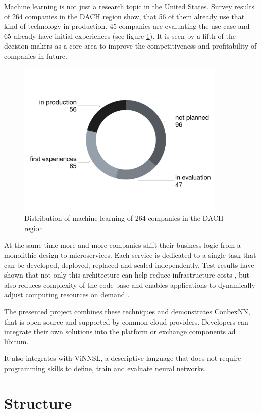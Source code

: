 Machine learning is not just a research topic in the United States.
Survey results of 264 companies in the DACH region show, that 56 of them
already use that kind of technology in production. 45 companies are
evaluating the use case and 65 already have initial experiences (see
figure \ref{img.crisp_ml_verbreitung}). It is seen by a fifth of the
decision-makers as a core area to improve the competitiveness and
profitability of companies in future. \cite{crisp}

\begin{figure}
\centering
\includegraphics[width=10.00000cm]{images/crisp_ml_verbreitung}
\caption{Distribution of machine learning of 264 companies in the DACH
region \cite{crisp}\label{img.crisp_ml_verbreitung}}
\end{figure}

At the same time more and more companies shift their business logic from
a monolithic design to microservices. Each service is dedicated to a
single task that can be developed, deployed, replaced and scaled
independently. Test results have shown that not only this architecture
can help reduce infrastructure costs
\cite{villamizar2}\cite{villamizar}, but also reduces complexity of the
code base and enables applications to dynamically adjust computing
resources on demand \cite{villamizar}.

The presented project combines these techniques and demonstrates
ConbexNN, that is open-source and supported by common cloud providers.
Developers can integrate their own solutions into the platform or
exchange components ad libitum.

It also integrates with ViNNSL, a descriptive language that does not
require programming skills to define, train and evaluate neural
networks.

\section{Structure}\label{structure}

